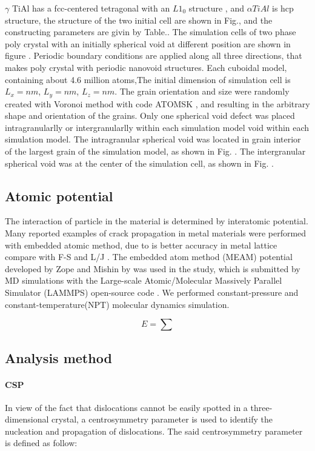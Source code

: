 \documentclass[final,5p,times,onecolumn]{elsarticle}
\begin{document}
$\gamma $ TiAl has a fcc-centered tetragonal with an $L1_0$ structure \cite{}, and $\alpha TiAl$ is hcp structure, the structure of the two initial cell are shown in Fig.\cite{}, and the constructing parameters are givin by Table.\cite{}. The simulation cells of two phase poly crystal with an initially spherical void at different position are shown in figure \cite{}. Periodic boundary conditions are applied along all three directions, that makes poly crystal with periodic nanovoid structures. Each cuboidal model, containing about 4.6 million atoms,The initial dimension of simulation cell is  $L_x = nm$, $L_y =  nm$, $L_z =  nm$. The grain orientation and size were randomly created with Voronoi method with code ATOMSK \cite{}, and resulting in the arbitrary shape and orientation of the grains. Only one spherical void defect was placed intragranularlly or intergranularlly within each simulation model void within each simulation model. The intragranular spherical void was located in grain interior of the largest grain of the simulation model, as shown in Fig. \cite{}. The intergranular spherical void was at the center of the simulation cell, as shown in Fig. \cite{}.

\subsection{Atomic potential}
The interaction of particle in the material is determined by interatomic potential. Many reported examples of crack propagation in metal materials were performed with embedded atomic method, due to is better accuracy in metal lattice compare with F-S and L/J \cite{}. The embedded atom method (MEAM) potential developed by Zope and Mishin by \cite{} was used in the study, which is submitted by MD simulations with the Large-scale Atomic/Molecular Massively Parallel Simulator (LAMMPS) open-source code \cite{}. We performed constant-pressure and constant-temperature(NPT) molecular dynamics simulation.

\begin{equation} \label{eq:eam} 
	E= \displaystyle\sum
\end{equation}

\subsection{Analysis method}
\paragraph{CSP}
In view of the fact that dislocations cannot be easily spotted in a three-dimensional crystal, a centrosymmetry parameter \cite{} is used to identify the nucleation and propagation of dislocations. The said centrosymmetry parameter is defined as follow:
\end{document}
